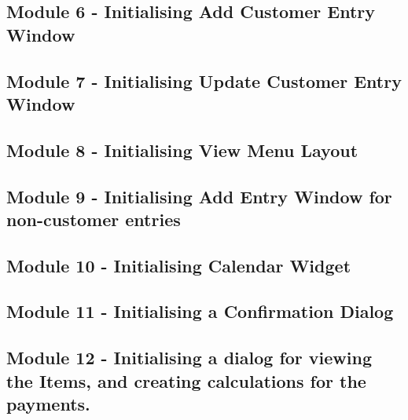 \begin{landscape}
\begin{scriptsize}
\subsection{Module 6 - Initialising Add Customer Entry Window}

 \label{ssec:AddEntryWindow.py}

\subsection{Module 7 - Initialising Update Customer Entry Window}

 \label{ssec:UpdateEntryWindow.py}

\subsection{Module 8 - Initialising View Menu Layout}

 \label{ssec:ViewWindow.py}

\subsection{Module 9 - Initialising Add Entry Window for non-customer entries}


\subsection{Module 10 - Initialising Calendar Widget}

 \label{ssec:CalendarWidget.py}

\subsection{Module 11 - Initialising a Confirmation Dialog}


\subsection{Module 12 - Initialising a dialog for viewing the Items, and creating calculations for the payments.}


\end{scriptsize}
\end{landscape}
